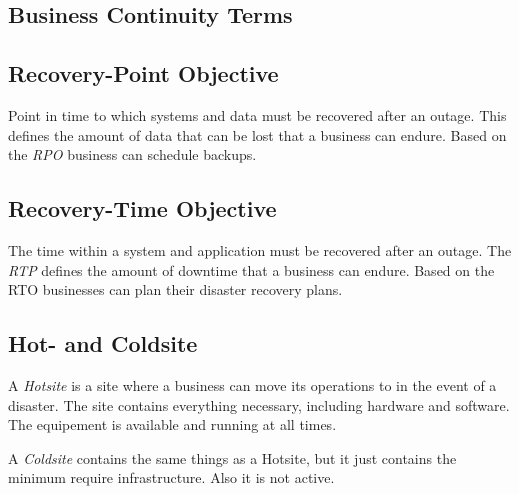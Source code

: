 \subsection{Business Continuity Terms} %
\label{sub:business_continuity_terms}
	\subsection{Recovery-Point Objective} %
	\label{sub:recovery_point_objective}
		Point in time to which systems and data must be recovered after an outage.
		This defines the amount of data that can be lost that a business can endure.
		Based on the \emph{RPO} business can schedule backups.

	\subsection{Recovery-Time Objective} %
	\label{sub:recovery_time_objective}
		The time within a system
		and application must be recovered after an outage.
		The \emph{RTP} defines the amount of downtime
		that a business can endure.
		Based on the RTO businesses can plan their disaster recovery plans.

	\subsection{Hot- and Coldsite} %
	\label{sub:hot_and_coldsite}
		A \emph{Hotsite} is a site where a business can move its operations to
		in the event of a disaster.
		The site contains everything necessary,
		including hardware and software.
		The equipement is available and running at all times.

		A \emph{Coldsite} contains the same things as a Hotsite,
		but it just contains the minimum require infrastructure.
		Also it is not active.

